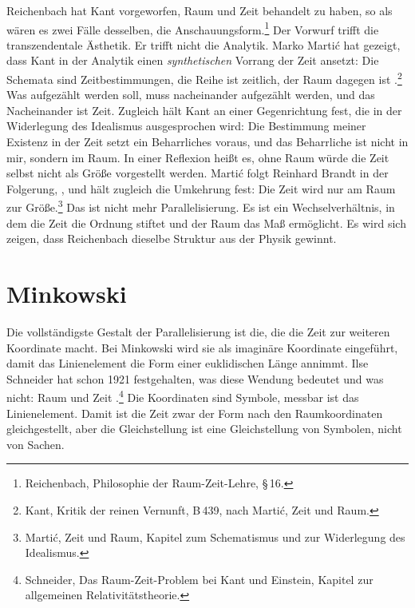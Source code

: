 Reichenbach hat Kant vorgeworfen, Raum und Zeit  behandelt zu haben, so als wären es zwei Fälle desselben, die Anschauungsform.\footnote{Reichenbach, Philosophie der Raum-Zeit-Lehre, \S\,16.} Der Vorwurf trifft die transzendentale Ästhetik. Er trifft nicht die Analytik. Marko Martić hat gezeigt, dass Kant in der Analytik einen \emph{synthetischen} Vorrang der Zeit ansetzt: Die Schemata sind Zeitbestimmungen, die Reihe ist zeitlich, der Raum dagegen ist .\footnote{Kant, Kritik der reinen Vernunft, B\,439, nach Martić, Zeit und Raum.} Was aufgezählt werden soll, muss nacheinander aufgezählt werden, und das Nacheinander ist Zeit. Zugleich hält Kant an einer Gegenrichtung fest, die in der Widerlegung des Idealismus ausgesprochen wird: Die Bestimmung meiner Existenz in der Zeit setzt ein Beharrliches voraus, und das Beharrliche ist nicht in mir, sondern im Raum. In einer Reflexion heißt es, ohne Raum würde die Zeit selbst nicht als Größe vorgestellt werden. Martić folgt Reinhard Brandt in der Folgerung, , und hält zugleich die Umkehrung fest: Die Zeit wird nur am Raum zur Größe.\footnote{Martić, Zeit und Raum, Kapitel zum Schematismus und zur Widerlegung des Idealismus.} Das ist nicht mehr Parallelisierung. Es ist ein Wechselverhältnis, in dem die Zeit die Ordnung stiftet und der Raum das Maß ermöglicht. Es wird sich zeigen, dass Reichenbach dieselbe Struktur aus der Physik gewinnt.

\section{Minkowski}

Die vollständigste Gestalt der Parallelisierung ist die, die die Zeit zur weiteren Koordinate macht. Bei Minkowski wird sie als imaginäre Koordinate eingeführt, damit das Linienelement die Form einer euklidischen Länge annimmt. Ilse Schneider hat schon 1921 festgehalten, was diese Wendung bedeutet und was nicht: Raum und Zeit .\footnote{Schneider, Das Raum-Zeit-Problem bei Kant und Einstein, Kapitel zur allgemeinen Relativitätstheorie.} Die Koordinaten sind Symbole, messbar ist das Linienelement. Damit ist die Zeit zwar der Form nach den Raumkoordinaten gleichgestellt, aber die Gleichstellung ist eine Gleichstellung von Symbolen, nicht von Sachen.


